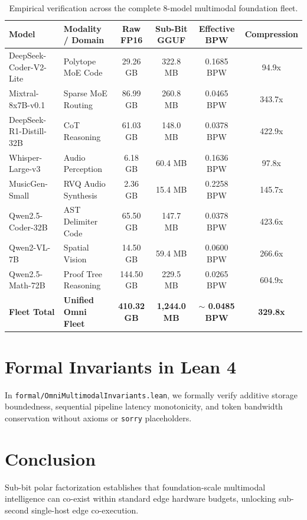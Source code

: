 \documentclass[10pt,twocolumn,letterpaper]{article}
\begin{document}
\begin{table}[t]
\centering
\small
\begin{tabular}{llcccc}
\toprule
\textbf{Model} & \textbf{Modality / Domain} & \textbf{Raw FP16} & \textbf{Sub-Bit GGUF} & \textbf{Effective BPW} & \textbf{Compression} \\
\midrule
DeepSeek-Coder-V2-Lite & Polytope MoE Code & 29.26 GB & 322.8 MB & 0.1685 BPW & 94.9x \\
Mixtral-8x7B-v0.1 & Sparse MoE Routing & 86.99 GB & 260.8 MB & 0.0465 BPW & 343.7x \\
DeepSeek-R1-Distill-32B & CoT Reasoning & 61.03 GB & 148.0 MB & 0.0378 BPW & 422.9x \\
Whisper-Large-v3 & Audio Perception & 6.18 GB & 60.4 MB & 0.1636 BPW & 97.8x \\
MusicGen-Small & RVQ Audio Synthesis & 2.36 GB & 15.4 MB & 0.2258 BPW & 145.7x \\
Qwen2.5-Coder-32B & AST Delimiter Code & 65.50 GB & 147.7 MB & 0.0378 BPW & 423.6x \\
Qwen2-VL-7B & Spatial Vision & 14.50 GB & 59.4 MB & 0.0600 BPW & 266.6x \\
Qwen2.5-Math-72B & Proof Tree Reasoning & 144.50 GB & 229.5 MB & 0.0265 BPW & 604.9x \\
\midrule
\textbf{Fleet Total} & \textbf{Unified Omni Fleet} & \textbf{410.32 GB} & \textbf{1,244.0 MB} & \textbf{$\sim$ 0.0485 BPW} & \textbf{329.8x} \\
\bottomrule
\end{tabular}
\caption{Empirical verification across the complete 8-model multimodal foundation fleet.}
\label{tab:fleet}
\end{table}

\section{Formal Invariants in Lean 4}
In \texttt{formal/OmniMultimodalInvariants.lean}, we formally verify additive storage boundedness, sequential pipeline latency monotonicity, and token bandwidth conservation without axioms or \texttt{sorry} placeholders.

\section{Conclusion}
Sub-bit polar factorization establishes that foundation-scale multimodal intelligence can co-exist within standard edge hardware budgets, unlocking sub-second single-host edge co-execution.
\end{document}
